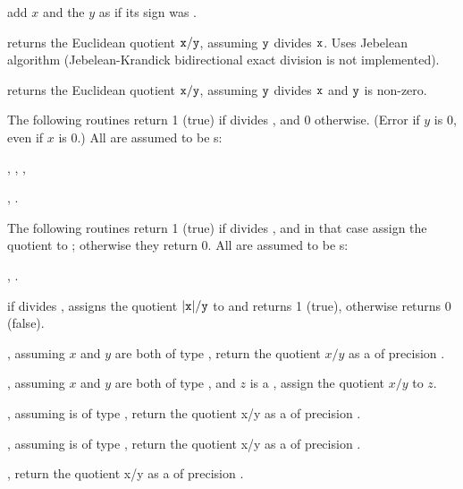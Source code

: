 add $x$ and the  $y$
as if its sign was .


 returns the Euclidean quotient
${\tt x} / {\tt y}$, assuming ${\tt y}$ divides ${\tt x}$. Uses Jebelean
algorithm (Jebelean-Krandick bidirectional exact division is not
implemented).

 returns the Euclidean quotient
${\tt x} / {\tt y}$, assuming ${\tt y}$ divides
${\tt x}$ and ${\tt y}$ is non-zero.

The following routines return 1 (true) if  divides , and
0 otherwise. (Error if $y$ is $0$, even if $x$ is $0$.) All  are assumed
to be s:

,
,
,

,
.

The following routines return 1 (true) if  divides , and in
that case assign the quotient to ; otherwise they return 0. All
 are assumed to be s:

,
.

 if  divides , assigns
the quotient $|{\tt x}|/{\tt y}$ to  and returns 1 (true), otherwise
returns 0 (false).


, assuming $x$ and $y$
are both of type , return the quotient $x/y$ as a  of
precision .

, assuming $x$ and $y$
are both of type , and $z$ is a ,
assign the quotient $x/y$ to $z$.

, assuming 
is of type , return the quotient x/y as a  of
precision .

, assuming 
is of type , return the quotient x/y as a  of
precision .

, return the quotient x/y as a
 of precision .


